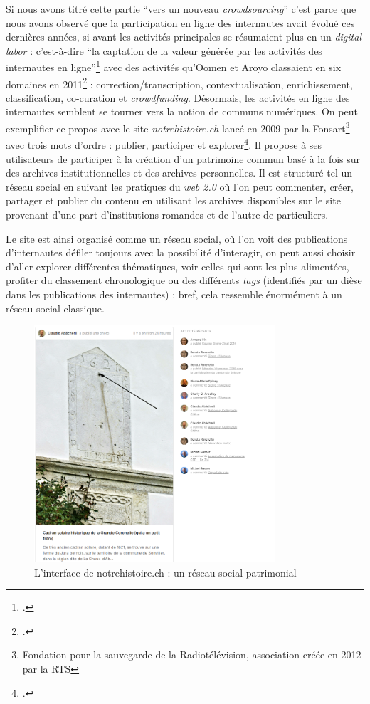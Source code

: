 Si nous avons titré cette partie \enquote{vers un nouveau \textit{crowdsourcing}} c’est parce que nous avons observé que la participation en ligne des internautes avait évolué ces dernières années, si avant les activités principales se résumaient plus en un \textit{digital labor} : c’est-à-dire \enquote{la captation de la valeur générée par les activités des internautes en ligne}\footcite{zotero-365} avec des activités qu’Oomen et Aroyo classaient en six domaines en 2011\footcite[(cité par)]{neroulidis_crowdsourcing_2015} : correction/transcription, contextualisation, enrichissement, classification, co-curation et \textit{crowdfunding}. Désormais, les activités en ligne des internautes semblent se tourner vers la notion de communs numériques. On peut exemplifier ce propos avec le site \textit{notrehistoire.ch} lancé en 2009 par la Fonsart\footnote{Fondation pour la sauvegarde de la Radiotélévision, association créée en 2012 par la RTS} avec trois mots d’ordre : publier, participer et explorer\footcite{zotero-361}. Il propose à ses utilisateurs de participer à la création d’un patrimoine commun basé à la fois sur des archives institutionnelles et des archives personnelles. Il est structuré tel un réseau social en suivant les pratiques du \textit{web 2.0} où l’on peut commenter, créer, partager et publier du contenu en utilisant les archives disponibles sur le site provenant d’une part d’institutions romandes et de l’autre de particuliers.  

Le site est ainsi organisé comme un réseau social, où l’on voit des publications d’internautes défiler toujours avec la possibilité d’interagir, on peut aussi choisir d’aller explorer différentes thématiques, voir celles qui sont les plus alimentées, profiter du classement chronologique ou des différents \textit{tags} (identifiés par un dièse dans les publications des internautes) : bref, cela ressemble énormément à un réseau social classique.



\begin{figure}[h!]
	\centering
	\includegraphics[width=0.8\textwidth]{images/image22.png}
	\caption{L'interface de notrehistoire.ch : un réseau social patrimonial}
	\label{fig:image21}
\end{figure}


